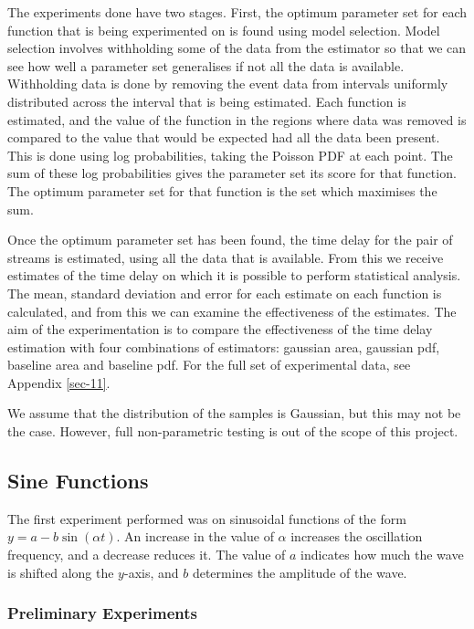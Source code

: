 \documentclass[a4paper,11pt]{article}
\begin{document}
The experiments done have two stages. First, the optimum parameter set for each
function that is being experimented on is found using model selection. Model
selection involves withholding some of the data from the estimator so that we
can see how well a parameter set generalises if not all the data is
available. Withholding data is done by removing the event data from intervals
uniformly distributed across the interval that is being estimated. Each function
is estimated, and the value of the function in the regions where data was
removed is compared to the value that would be expected had all the data been
present. This is done using log probabilities, taking the Poisson PDF at each
point. The sum of these log probabilities gives the parameter set its score for
that function. The optimum parameter set for that function is the set which
maximises the sum.

Once the optimum parameter set has been found, the time delay
for the pair of streams is estimated, using all the data that is available. From
this we receive estimates of the time delay on which it is possible to perform
statistical analysis. The mean, standard deviation and error for each estimate
on each function is calculated, and from this we can examine the effectiveness
of the estimates. The aim of the experimentation is to compare the effectiveness
of the time delay estimation with four combinations of estimators: gaussian
area, gaussian pdf, baseline area and baseline pdf. For the full set of
experimental data, see Appendix \ref{sec-11}.

We assume that the distribution of the samples is Gaussian, but this may not be
the case. However, full non-parametric testing is out of the scope of this project.
\subsection{Sine Functions}
\label{sec-7-1}

The first experiment performed was on sinusoidal functions of the form
$y=a-b\sin(\alpha t)$. An increase in the value of $\alpha$ increases the
oscillation frequency, and a decrease reduces it. The value of $a$ indicates how
much the wave is shifted along the $y$-axis, and $b$ determines the
amplitude of the wave.
\subsubsection{Preliminary Experiments}
\label{sec-7-1-1}
\end{document}
